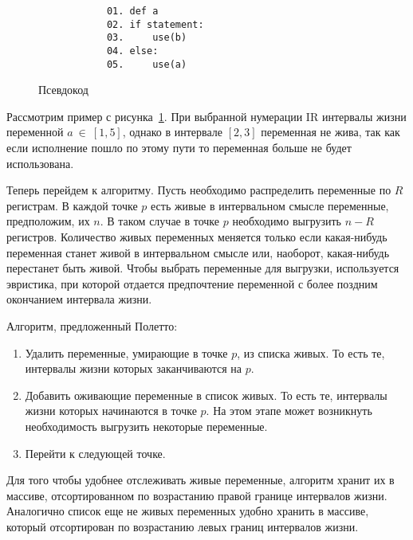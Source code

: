 \begin{example}
    \begin{figure}[h]
        \centering
        \lstset{basicstyle=\ttfamily\small, frame=single}
        \begin{lstlisting}
            01. def a
            02. if statement:
            03.     use(b)
            04. else:
            05.     use(a)
        \end{lstlisting}
        \caption{Псевдокод}
        \label{fig:example_live_intervals}
    \end{figure}

    Рассмотрим пример с рисунка~\ref{fig:example_live_intervals}. При выбранной нумерации IR интервалы жизни переменной
    $a~\in~[1,5]$, однако в интервале $[2,3]$ переменная не жива, так как если исполнение пошло по этому пути
    то переменная больше не будет использована.
    
\end{example}

Теперь перейдем к алгоритму. Пусть необходимо распределить переменные по $R$ регистрам. В каждой точке
$p$ есть живые в интервальном смысле переменные, предположим, их $n$. В таком случае в точке $p$
необходимо выгрузить $n - R$ регистров. Количество живых переменных меняется только если какая-нибудь
переменная станет живой в интервальном смысле или, наоборот, какая-нибудь перестанет быть живой.
Чтобы выбрать переменные для выгрузки, используется эвристика,
при которой отдается предпочтение переменной с более поздним окончанием интервала жизни.

Алгоритм, предложенный Полетто:

\begin{enumerate}
    \item Удалить переменные, умирающие в точке $p$, из списка живых.
    То есть те, интервалы жизни которых заканчиваются на $p$. \label{poleto_alg:delete_death}

    \item Добавить оживающие переменные в список живых.
    То есть те, интервалы жизни которых начинаются в точке $p$.
    На этом этапе может возникнуть необходимость выгрузить некоторые переменные. \label{poleto_alg:add_alive}

    \item Перейти к следующей точке.
\end{enumerate}

Для того чтобы удобнее отслеживать живые переменные, алгоритм хранит их в массиве, отсортированном по
возрастанию правой границе интервалов жизни. Аналогично список еще не живых переменных удобно хранить в массиве,
который отсортирован по возрастанию левых границ интервалов жизни.


